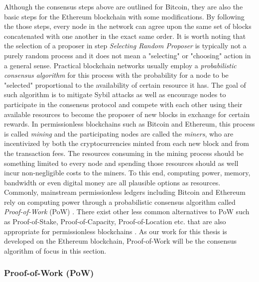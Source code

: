Although the consensus steps above are outlined for Bitcoin, they are also the basic steps for the Ethereum blockchain with some modifications. By following the those steps, every node in the network can agree upon the same set of blocks concatenated with one another in the exact same order. It is worth noting that the selection of a proposer in step \textit{Selecting Random Proposer} is typically not a purely random process and it does not mean a "selecting" or "choosing" action in a general sense. Practical blockchain networks usually employ a \textit{probabilistic consensus algorithm} for this process with the probability for a node to be "selected" proportional to the availability of certain resource it has. The goal of such algorithm is to mitigate Sybil attacks as well as encourage nodes to participate in the consensus protocol and compete with each other using their available resources to become the proposer of new blocks in exchange for certain rewards. 
In permissionless blockchains such as Bitcoin and Ethereum, this process is called \textit{mining} and the participating nodes are called the \textit{miners}, who are incentivized by both the cryptocurrencies minted from each new block and from the transaction fees. The resources consuming in the mining process should be something limited to every node and spending those resources should as well incur non-negligible costs to the miners. To this end, computing power, memory, bandwidth or even digital money are all plausible options as resources. Commonly, mainstream permissionless ledgers including Bitcoin and Ethereum rely on computing power through a probabilistic consensus algorithm called \textit{Proof-of-Work} (PoW) \cite{satoshi2008peer}. There exist other less common alternatives to PoW such as Proof-of-Stake, Proof-of-Capacity, Proof-of-Location etc. that are also appropriate for permissionless blockchains \cite{natoli2019deconstructing}.
As our work for this thesis is developed on the Ethereum blockchain, Proof-of-Work will be the consensus algorithm of focus in this section.

\subsubsection{Proof-of-Work (PoW)} \label{subsubsec:pow}      


